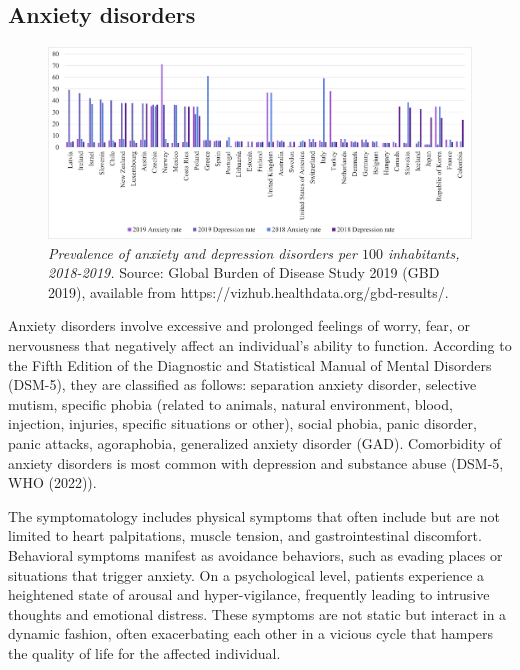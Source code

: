         \subsection{Anxiety disorders}

            \begin{figure}  %
                \centering
                \includegraphics[width=\textwidth]{GRAPHS/anxiety_depression_100_rate_2018_2019.png}
                \caption{\emph{Prevalence of anxiety and depression disorders per $100$ inhabitants, 2018-2019.}
                {\scriptsize Source: Global Burden of Disease Study 2019 (GBD 2019), available from https://vizhub.healthdata.org/gbd-results/.}}
                \label{fig:anxiety_OECD}
            \end{figure}
            
            Anxiety disorders involve excessive and prolonged feelings of worry, fear, or nervousness that negatively affect an individual's ability to function. According to the Fifth Edition of the Diagnostic and Statistical Manual of Mental Disorders (DSM-5), they are classified as follows: separation anxiety disorder, selective mutism, specific phobia (related to animals, natural environment, blood, injection, injuries, specific situations or other), social phobia, panic disorder, panic attacks, agoraphobia, generalized anxiety disorder (GAD). Comorbidity of anxiety disorders is most common with depression and substance abuse (DSM-5, WHO (2022)).

            The symptomatology includes physical symptoms that often include but are not limited to heart palpitations, muscle tension, and gastrointestinal discomfort. Behavioral symptoms manifest as avoidance behaviors, such as evading places or situations that trigger anxiety. On a psychological level, patients experience a heightened state of arousal and hyper-vigilance, frequently leading to intrusive thoughts and emotional distress. These symptoms are not static but interact in a dynamic fashion, often exacerbating each other in a vicious cycle that hampers the quality of life for the affected individual.


